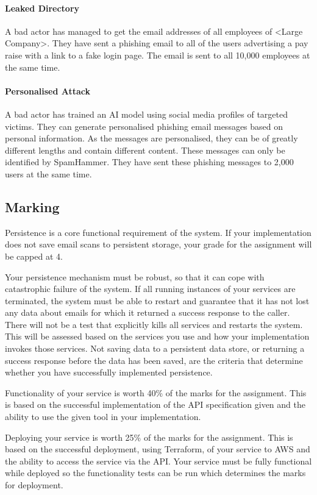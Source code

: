 \documentclass{csse4400}
\begin{document}
\paragraph{Leaked Directory}
A bad actor has managed to get the email addresses of all employees of <Large Company>.
They have sent a phishing email to all of the users advertising a pay raise with a link to a fake login page.
The email is sent to all 10,000 employees at the same time.

\paragraph{Personalised Attack}
A bad actor has trained an AI model using social media profiles of targeted victims.
They can generate personalised phishing email messages based on personal information.
As the messages are personalised, they can be of greatly different lengths and contain different content.
These messages can only be identified by SpamHammer.
They have sent these phishing messages to 2,000 users at the same time.

\subsection{Marking}
Persistence is a core functional requirement of the system. If your implementation does not save email scans to persistent storage, your grade for the assignment will be capped at 4.

Your persistence mechanism must be robust, so that it can cope with catastrophic failure of the system. If all running instances of your services are terminated, the system must be able to restart and guarantee that it has not lost any data about emails for which it returned a success response to the caller. There will not be a test that explicitly kills all services and restarts the system. This will be assessed based on the services you use and how your implementation invokes those services. Not saving data to a persistent data store, or returning a success response before the data has been saved, are the criteria that determine whether you have successfully implemented persistence.

Functionality of your service is worth 40\% of the marks for the assignment. This is based on the successful implementation of the API specification given and the ability to use the given tool in your implementation.

Deploying your service is worth 25\% of the marks for the assignment. This is based on the successful deployment, using Terraform, of your service to AWS and the ability to access the service via the API. Your service must be fully functional while deployed so the functionality tests can be run which determines the marks for deployment.
\end{document}
